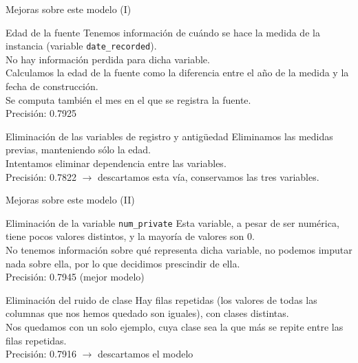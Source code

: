 \begin{frame}{Mejoras sobre este modelo (I)}
  \begin{block}{Edad de la fuente}
    Tenemos información de cuándo se hace la medida de la instancia
    (variable \texttt{date\_recorded}).\\

    No hay información perdida para dicha variable.\\

    Calculamos la edad de la fuente como la diferencia entre el año de
    la medida y la fecha de construcción.\\

    Se computa también el mes en el que se registra la fuente.\\

    Precisión: 0.7925
  \end{block}
  \begin{block}{Eliminación de las variables de registro y antigüedad}
    Eliminamos las medidas previas, manteniendo sólo la edad.\\

    Intentamos eliminar dependencia entre las variables.\\

    Precisión: 0.7822 $\rightarrow$ descartamos esta vía, conservamos
    las tres variables.
  \end{block}
\end{frame}

\begin{frame}{Mejoras sobre este modelo (II)}
  \begin{block}{Eliminación de la variable \texttt{num\_private}}
    Esta variable, a pesar de ser numérica, tiene pocos valores
    distintos, y la mayoría de valores son 0.\\

    No tenemos información sobre qué representa dicha variable, no podemos
    imputar nada sobre ella, por lo que decidimos prescindir de ella.\\

    Precisión: 0.7945 (mejor modelo)
  \end{block}
    \begin{block}{Eliminación del ruido de clase}
    Hay filas repetidas (los valores de todas las columnas que nos
    hemos quedado son iguales), con clases distintas.\\

    Nos quedamos con un solo ejemplo, cuya clase sea la que más se
    repite entre las filas repetidas.\\

    Precisión: 0.7916 $\rightarrow$ descartamos el modelo
  \end{block}
\end{frame}

